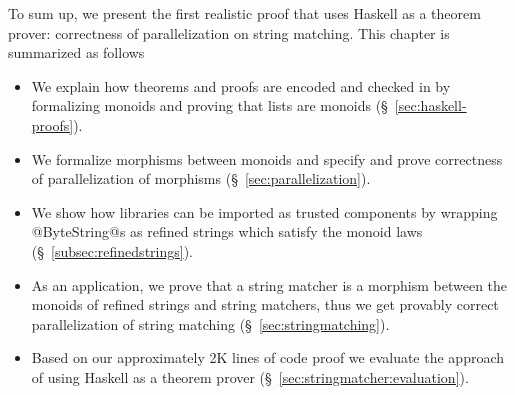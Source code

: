 To sum up, we present the first realistic proof that 
uses Haskell as a theorem prover:
correctness of parallelization on string matching.
%
This chapter is summarized as follows
\begin{itemize}
\item We explain how theorems and proofs are encoded and checked in \toolname
by formalizing monoids and proving that lists are monoids
(\S~\ref{sec:haskell-proofs}).
\item We formalize morphisms between monoids and
specify and prove correctness of parallelization of morphisms
(\S~\ref{sec:parallelization}).
\item We show how libraries can be imported as trusted components by wrapping
@ByteString@s as refined strings which satisfy the monoid laws (\S~\ref{subsec:refinedstrings}).
\item As an application, we prove that a string matcher is a morphism between the monoids of refined strings
and string matchers,  thus we get provably correct parallelization of string matching (\S~\ref{sec:stringmatching}).
\item Based on our approximately 2K lines of code proof we evaluate the approach of using Haskell as a theorem prover
(\S~\ref{sec:stringmatcher:evaluation}).
\end{itemize}
